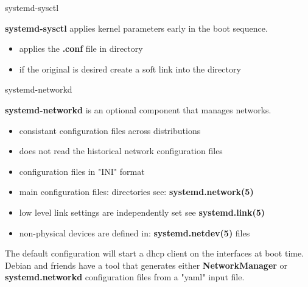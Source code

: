 \cprotect\note{
	}


\begin{frame}
	{systemd-sysctl} 

	\textbf{systemd-sysctl} applies kernel parameters 
	early in the boot sequence.  
	\begin{itemize} 
		\item applies the \textbf{.conf} file in  directory
		\item if the original  is desired 
			create a soft link into the  directory
		\end{itemize}

\end{frame}

\cprotect\note{

	}

\begin{frame} 
	{systemd-networkd}

	\textbf{systemd-networkd} is an optional component that manages networks.
	\begin{itemize}
		\item consistant configuration files across distributions
		\item does not read the historical network configuration files
		\item configuration files in "INI" format 
		\item main configuration files: 
		 directories see: 
			\textbf{systemd.network(5)} 
		\item low level link settings are independently set
			see \textbf{systemd.link(5)}
		\item non-physical devices are defined in:
			\textbf{systemd.netdev(5)} files
		\end{itemize}

		The default configuration will start a dhcp client on the 
		interfaces at boot time. \\

		Debian and friends have a tool that generates
		either \textbf{NetworkManager} or \textbf{systemd.networkd}
		configuration files from a "yaml" input file.


\end{frame} 

\cprotect\note{

	}

